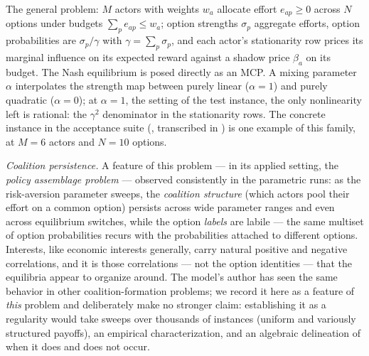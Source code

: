 The general problem: $M$ actors with weights $w_a$ allocate effort
$e_{ap} \ge 0$ across $N$ options under budgets $\sum_p e_{ap} \le w_a$;
option strengths $\sigma_p$ aggregate efforts, option probabilities are
$\sigma_p / \gamma$ with $\gamma = \sum_p \sigma_p$, and each actor's
stationarity row prices its marginal influence on its expected reward
against a shadow price $\beta_a$ on its budget. The Nash equilibrium is
posed directly as an MCP. A mixing parameter $\alpha$ interpolates the
strength map between purely linear ($\alpha = 1$) and purely quadratic
($\alpha = 0$); at $\alpha = 1$, the setting of the test instance, the only
nonlinearity left is rational: the $\gamma^2$ denominator in the
stationarity rows. The concrete instance in the acceptance suite
(, transcribed in
) is one example of this family, at
$M = 6$ actors and $N = 10$ options.

\emph{Coalition persistence.} A feature of this problem --- in its applied
setting, the \emph{policy assemblage problem} --- observed consistently
in the parametric runs: as the risk-aversion parameter sweeps, the
\emph{coalition structure} (which actors pool their effort on a common
option) persists across wide parameter ranges and even across equilibrium
switches, while the option \emph{labels} are labile --- the same multiset
of option probabilities recurs with the probabilities attached to different
options. Interests, like economic interests generally, carry natural
positive and negative correlations, and it is those correlations --- not
the option identities --- that the equilibria appear to organize around.
The model's author has seen the same behavior in other coalition-formation
problems; we record it here as a feature of \emph{this} problem and
deliberately make no stronger claim: establishing it as a regularity would
take sweeps over thousands of instances (uniform and variously structured
payoffs), an empirical characterization, and an algebraic delineation of
when it does and does not occur.

